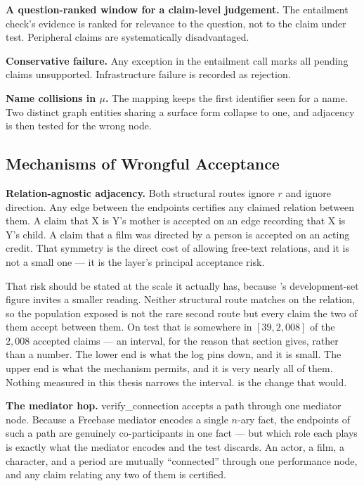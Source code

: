 \textbf{A question-ranked window for a claim-level judgement.} The entailment
check's evidence is ranked for relevance to the question, not to the claim under
test. Peripheral claims are systematically disadvantaged.

\textbf{Conservative failure.} Any exception in the entailment call marks all
pending claims unsupported. Infrastructure failure is recorded as rejection.

\textbf{Name collisions in $\mu$.} The mapping keeps the first identifier seen
for a name. Two distinct graph entities sharing a surface form collapse to one,
and adjacency is then tested for the wrong node.

\subsection*{Mechanisms of Wrongful Acceptance}

\textbf{Relation-agnostic adjacency.} Both structural routes ignore $r$ and
ignore direction. Any edge between the endpoints certifies any claimed relation
between them. A claim that X is Y's mother is accepted on an edge recording that
X is Y's child. A claim that a film was directed by a person is accepted on an
acting credit. That symmetry is the direct cost of allowing free-text
relations, and it is not a small one --- it is the layer's principal
acceptance risk.

That risk should be stated at the scale it actually has, because
's development-set figure invites a smaller reading.
Neither structural route matches on the relation, so the population exposed is
not the rare second route but every claim the two of them accept between them.
On test that is somewhere in $[39, 2{,}008]$ of the $2{,}008$ accepted
claims --- an interval, for the reason that section gives, rather than a number.
The lower end is what the log pins down, and it is small. The upper end is
what the mechanism permits, and it is very nearly all of them. Nothing
measured in this thesis narrows the interval.  is the
change that would.

\textbf{The mediator hop.} \textsf{verify\_connection} accepts a path through
one mediator node. Because a Freebase mediator encodes a single $n$-ary fact,
the endpoints of such a path are genuinely co-participants in one fact --- but
which role each plays is exactly what the mediator encodes and the test
discards. An actor, a film, a character, and a period are mutually ``connected''
through one performance node, and any claim relating any two of them is
certified.


